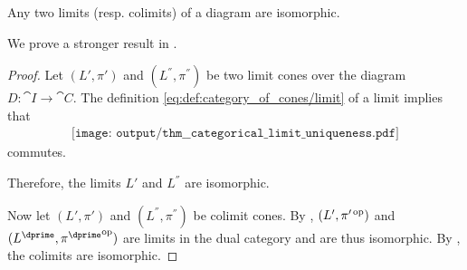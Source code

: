 \begin{lemma}\label{thm:categorical_limit_uniqueness_lemma}
  Any two limits (resp. colimits) of a diagram are isomorphic.

  We prove a stronger result in .
\end{lemma}
\begin{proof}
  Let \( (L', \pi') \) and \( (L^\dprime, \pi^\dprime) \) be two limit cones over the diagram \( D: \cat{I} \to \cat{C} \). The definition \eqref{eq:def:category_of_cones/limit} of a limit implies that
  \begin{equation}\label{eq:thm:categorical_limit_uniqueness}
    \begin{aligned}
      \texttt{[image: output/thm\_\_categorical\_limit\_uniqueness.pdf]}
    \end{aligned}
  \end{equation}
  commutes.

  Therefore, the limits \( L' \) and \( L^\dprime \) are isomorphic.

  Now let \( (L', \pi') \) and \( (L^\dprime, \pi^\dprime) \) be colimit cones. By , \( (L', \pi'^{\operatorname{op}}) \) and \( (L^\dprime, {\pi^\dprime}^{\opcat}) \) are limits in the dual category and are thus isomorphic. By , the colimits are isomorphic.
\end{proof}

